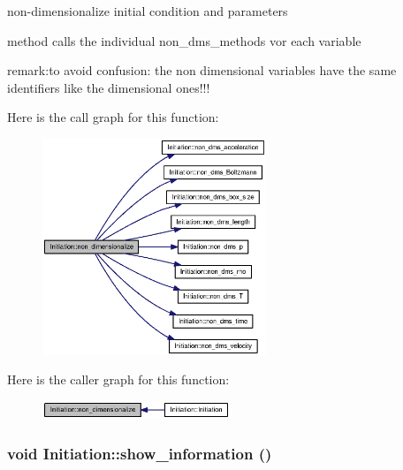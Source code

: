 non-dimensionalize initial condition and parameters 



method calls the individual non\_\-dms\_\-methods vor each variable\par
 remark:to avoid confusion: the non dimensional variables have the same identifiers like the dimensional ones!!!\par
\par
 

Here is the call graph for this function:\nopagebreak
\begin{figure}[H]
\begin{center}
\leavevmode
\includegraphics[width=190pt]{classInitiation_916e5b3e316dad1f524a1327b9e4aeb4_cgraph}
\end{center}
\end{figure}


Here is the caller graph for this function:\nopagebreak
\begin{figure}[H]
\begin{center}
\leavevmode
\includegraphics[width=159pt]{classInitiation_916e5b3e316dad1f524a1327b9e4aeb4_icgraph}
\end{center}
\end{figure}
\hypertarget{classInitiation_cdbf1374b9b0f0b50a0bb1d9abf76293}{
\subsubsection[{show\_\-information}]{\setlength{\rightskip}{0pt plus 5cm}void Initiation::show\_\-information ()}}
\label{classInitiation_cdbf1374b9b0f0b50a0bb1d9abf76293}


